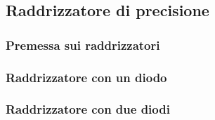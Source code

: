 \subsection{Raddrizzatore di precisione}

\subsubsection{Premessa sui raddrizzatori}

\subsubsection{Raddrizzatore con un diodo}

\subsubsection{Raddrizzatore con due diodi}